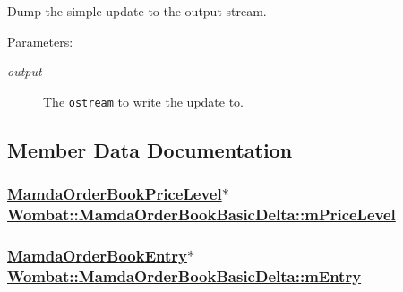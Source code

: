 Dump the simple update to the output stream. 

\begin{Desc}
\item[Parameters:]
\begin{description}
\item[{\em output}]The {\tt ostream} to write the update to. \end{description}
\end{Desc}


\subsection{Member Data Documentation}
\hypertarget{classWombat_1_1MamdaOrderBookBasicDelta_abd82c385997d03c79df774d690699f4}{
\subsubsection[mPriceLevel]{\setlength{\rightskip}{0pt plus 5cm}\hyperlink{classWombat_1_1MamdaOrderBookPriceLevel}{Mamda\-Order\-Book\-Price\-Level}$\ast$ \hyperlink{classWombat_1_1MamdaOrderBookBasicDelta_abd82c385997d03c79df774d690699f4}{Wombat::Mamda\-Order\-Book\-Basic\-Delta::m\-Price\-Level}}}
\label{classWombat_1_1MamdaOrderBookBasicDelta_abd82c385997d03c79df774d690699f4}


\hypertarget{classWombat_1_1MamdaOrderBookBasicDelta_6c98a2021f67c632baa255236b20f288}{
\subsubsection[mEntry]{\setlength{\rightskip}{0pt plus 5cm}\hyperlink{classWombat_1_1MamdaOrderBookEntry}{Mamda\-Order\-Book\-Entry}$\ast$ \hyperlink{classWombat_1_1MamdaOrderBookBasicDelta_6c98a2021f67c632baa255236b20f288}{Wombat::Mamda\-Order\-Book\-Basic\-Delta::m\-Entry}}}
\label{classWombat_1_1MamdaOrderBookBasicDelta_6c98a2021f67c632baa255236b20f288}


